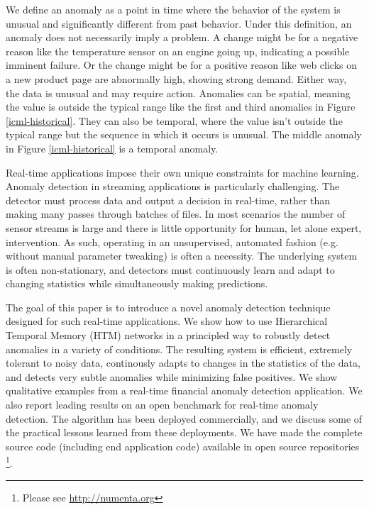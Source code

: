 \documentclass{article}
\begin{document}
We define an anomaly as a point in time where the behavior of the system is
unusual and significantly different from past behavior. Under this definition,
an anomaly does not necessarily imply a problem. A change might be for a
negative reason like the temperature sensor on an engine going up, indicating a
possible imminent failure. Or the change might be for a positive reason like web
clicks on a new product page are abnormally high, showing strong demand. Either
way, the data is unusual and may require action. Anomalies can be spatial,
meaning the value is outside the typical range like the first and third
anomalies in Figure \ref{icml-historical}. They can also be temporal, where
the value isn't outside the typical range but the sequence in which it occurs
is unusual. The middle anomaly in Figure \ref{icml-historical} is a temporal
anomaly.

Real-time applications impose their own unique constraints for machine
learning. Anomaly detection in streaming applications is particularly
challenging. The detector must process data and output a decision in real-time,
rather than making many passes through batches of files. In most scenarios the
number of sensor streams is large and there is little opportunity for human, let
alone expert, intervention. As such, operating in an unsupervised, automated
fashion (e.g. without manual parameter tweaking) is often a necessity. The
underlying system is often non-stationary, and detectors must continuously
learn and adapt to changing statistics while simultaneously making predictions.

The goal of this paper is to introduce a novel anomaly detection technique
designed for such real-time applications. We show how to use Hierarchical
Temporal Memory (HTM) networks \cite{Hawkins2016, Padilla2013, Rozado2012} in a
principled way to robustly detect anomalies in a variety of conditions. The
resulting system is efficient, extremely tolerant to noisy data, continously
adapts to changes in the statistics of the data, and detects very subtle
anomalies while minimizing false positives. We show qualitative examples from a
real-time financial anomaly detection application. We also report leading
results on an open benchmark for real-time anomaly detection. The algorithm has
been deployed commercially, and we discuss some of the practical lessons learned
from these deployments. We have made the complete source code (including end
application code) available in open source repositories
\footnote{Please see \url{http://numenta.org}}.
\end{document}
